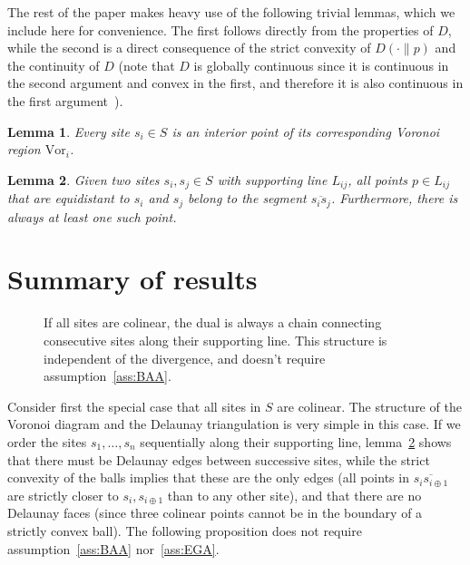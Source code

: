 \documentclass[11pt]{article}
\newtheorem{lemma}{Lemma}
\newcommand{\Sites}{S}
\newcommand{\Vor}{\text{Vor}}
\newcommand{\D}[2]{D\left(#1 \parallel #2\right)}
\begin{document}
The rest of the paper makes heavy use of the following trivial lemmas, which we include here for convenience. 
The first follows directly from the properties of $D$, while the second
	is a direct consequence of the strict convexity of $\D{\cdot}{p}$ and the continuity of $D$
	(note that $D$ is globally continuous since it is continuous in the second argument 
	and convex in the first, and therefore it is also continuous in the first argument~\cite{rockafellar1997convex}). 



\begin{lemma}\label{lem:site}
Every site $s_i\in\Sites$ is an interior point of its corresponding Voronoi region $\Vor_i$. 
\end{lemma}



\begin{lemma}\label{lem:midpoint}
Given two sites $s_i,s_j\in \Sites$ with supporting line $L_{ij}$, 
	all points $p\in L_{ij}$ that are equidistant to $s_i$ and $s_j$ 
	belong to the segment $\overline{s_i s_j}$. 
Furthermore, there is always at least one such point. \end{lemma}





\section{Summary of results}\label{sec:summary}


\begin{figure}[ht]
\begin{center}
\quad
{}
\caption{If all sites are colinear, the dual is always a chain connecting consecutive sites along their supporting line.
This structure is independent of the divergence, and doesn't require assumption~\ref{ass:BAA}. }
\label{fig:colinear}
\end{center}
\end{figure}

Consider first the special case that all sites in $\Sites$ are colinear. The structure of the Voronoi diagram and the Delaunay triangulation is very simple in this case. 
If we order the sites $s_1,\dots,s_n$ sequentially along their supporting line, 
lemma~\ref{lem:midpoint} shows that there must be Delaunay edges between successive sites, 
	while the strict convexity of the balls implies that these are the only edges
	(all points in $\overline{s_i s_{i\oplus 1}}$ are strictly closer to $s_i,s_{i\oplus 1}$ than to any other site), 
	and that there are no Delaunay faces
	(since three colinear points cannot be in the boundary of a strictly convex ball). 
The following proposition does not require assumption~\ref{ass:BAA} nor~\ref{ass:EGA}. 
\end{document}
